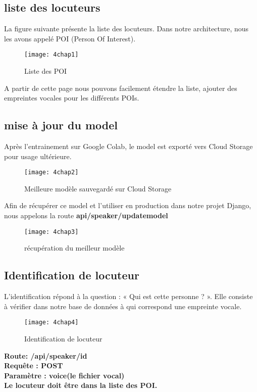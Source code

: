 \subsection{liste des locuteurs}
La figure suivante présente la liste des locuteurs. Dans notre architecture, nous les avons appelé POI (Person Of Interest). 

\begin{figure}[h]
	\centering
	\texttt{[image: 4chap1]}
	\caption{Liste des POI}
	\label{fig:4chap1}
\end{figure}
A partir de cette page nous pouvons facilement étendre la liste, ajouter des empreintes vocales pour les différents POIs.

\subsection{mise à jour du model}
Après l’entrainement sur Google Colab, le model est exporté vers Cloud Storage pour usage ultérieure.

\begin{figure}[h]
	\centering
	\texttt{[image: 4chap2]}
	\caption{Meilleure modèle sauvegardé sur Cloud Storage}
	\label{fig:4chap2}
\end{figure}
Afin de récupérer ce model et l’utiliser en production dans notre projet Django, nous appelons la route  \textbf{api/speaker/updatemodel}

\begin{figure}[h]
	\centering
	\texttt{[image: 4chap3]}
	\caption{récupération du meilleur modèle}
	\label{fig:4chap3}
\end{figure}

\subsection{Identification de locuteur}
L’identification répond à la question : « Qui est cette personne ? ». Elle consiste à vérifier dans notre base de données à qui correspond une empreinte vocale.  

\begin{figure}[h]
	\centering
	\texttt{[image: 4chap4]}
	\caption{Identification de locuteur}
	\label{fig:4chap4}
\end{figure}
\textbf{Route:  /api/speaker/id}
\\\textbf{Requête : POST}
\\\textbf{Paramètre : voice(le fichier vocal)}
\\\textbf{Le locuteur doit être dans la liste des POI.}

